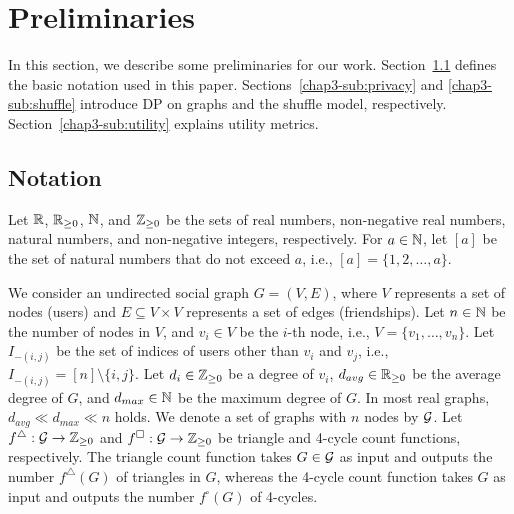 \section{Preliminaries}
\label{chap3-sec:preliminaries}
In this section, we describe some preliminaries for our work. 
Section~\ref{chap3-sub:notations} defines the basic notation used in this paper. 
Sections~\ref{chap3-sub:privacy} and \ref{chap3-sub:shuffle} introduce DP on graphs and the shuffle model, respectively. 
Section~\ref{chap3-sub:utility} explains utility metrics. 

\subsection{Notation}
\label{chap3-sub:notations}
Let $\mathbb{R}$, $\mathbb{R}_{\ge0}$, $\mathbb{N}$, and $\mathbb{Z}_{\ge0}$ be the sets of real numbers, non-negative real numbers, natural numbers, and non-negative integers, respectively. 
For $a\in\mathbb{N}$, let $[a]$ be the set of natural numbers that do not exceed $a$, i.e., $[a] = \{1, 2, \ldots, a\}$. 

We consider an undirected social graph $G=(V,E)$, where $V$ represents a set of nodes (users) and $E \subseteq V \times V$ represents a set of edges (friendships). 
Let $n\in\mathbb{N}$ be the number of nodes in $V$, and $v_i \in V$ be the $i$-th node, i.e., $V=\{v_1,\ldots,v_n\}$. 
Let $I_{-(i,j)}$ be the set of indices of users other than $v_i$ and $v_j$, i.e., $I_{-(i,j)} = [n]\setminus\{i,j\}$. 
Let 
$d_i \in \mathbb{Z}_{\ge0}$ be a degree of $v_i$, 
$d_{avg} \in \mathbb{R}_{\ge0}$ be the average degree of $G$, and $d_{max} \in \mathbb{N}$ be the maximum degree of $G$. 
In most real graphs, $d_{avg} \ll d_{max} \ll n$ holds. 
We denote a set of graphs with $n$ nodes by $\mathcal{G}$. 
Let $f^\triangle: \mathcal{G} \rightarrow \mathbb{Z}_{\ge0}$ and $f^\square: \mathcal{G} \rightarrow \mathbb{Z}_{\ge0}$ be triangle and 4-cycle count functions, respectively. 
The triangle count function takes $G \in \mathcal{G}$ as input and outputs the number $f^\triangle(G)$ of triangles in $G$, 
whereas the 4-cycle count function takes $G$ as input and outputs the number $f^\square(G)$ of 4-cycles. 

